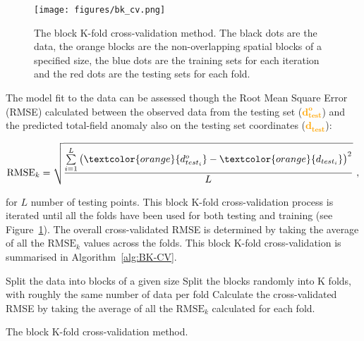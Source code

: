\begin{figure}[tb]
  \centering
  \texttt{[image: figures/bk\_cv.png]}
  \caption{
    The block K-fold cross-validation method. The black dots are the data, the orange blocks are the non-overlapping spatial blocks of a specified size, the blue dots are the training sets for each iteration and the red dots are the testing sets for each fold.
    }
  \label{fig:BK-CV}
\end{figure}

The model fit to the data can be assessed though the Root Mean Square Error (RMSE) calculated between the observed data from the testing set (\textcolor{orange}{$\mathbf{d^o_{test}}$}) and the predicted total-field anomaly also on the testing set coordinates (\textcolor{orange}{$\mathbf{d_{test}}$}):

\begin{equation}
    \label{eq:rmse}
    \text{RMSE}_k = \sqrt{\dfrac{\sum\limits_{i=1}^L \left(\textcolor{orange}{{d^o_{test_i}}} - \textcolor{orange}{{d_{test_i}}}\right)^2}{L}}
    \ ,
\end{equation}

\noindent
for $L$ number of testing points. This block K-fold cross-validation process is iterated until all the folds have been used for both testing and training (see Figure~\ref{fig:BK-CV}). The overall cross-validated RMSE is determined by taking the average of all the $\text{RMSE}_k$ values across the folds. This block K-fold cross-validation is summarised in Algorithm~\ref{alg:BK-CV}.

\begin{algorithm}[!h]
    Split the data into blocks of a given size
    \;
    Split the blocks randomly into K folds, with roughly the same number of data per fold
    \;
    Calculate the cross-validated RMSE by taking the average of all the $\text{RMSE}_k$ calculated for each fold.
    \BlankLine
    \caption{The block K-fold cross-validation method.}
    \label{alg:BK-CV}
\end{algorithm}

